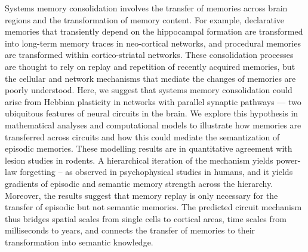 

Systems memory consolidation involves the transfer of memories across brain regions and the transformation of memory content. For example, declarative memories that transiently depend on the hippocampal formation are transformed into long-term memory traces in neo-cortical networks, and procedural memories are transformed within cortico-striatal networks. These consolidation processes are thought to rely on replay and repetition of recently acquired memories, but the cellular and network mechanisms that mediate the changes of memories are poorly understood. Here, we suggest that systems memory consolidation could arise from Hebbian plasticity in networks with parallel synaptic pathways --- two ubiquitous features of neural circuits in the brain. We explore this hypothesis in mathematical analyses and computational models to illustrate how memories are transferred across circuits and how this could mediate the semantization of episodic memories. These modelling results are in quantitative agreement with lesion studies in rodents. A hierarchical iteration of the mechanism yields power-law forgetting -- as observed in psychophysical studies in humans, and it yields gradients of episodic and semantic memory strength across the hierarchy. Moreover, the results suggest that memory replay is only necessary for the transfer of episodic but not semantic memories. The predicted circuit mechanism thus bridges spatial scales from single cells to cortical areas, time scales from milliseconds to years, and connects the transfer of memories to their transformation into semantic knowledge.

